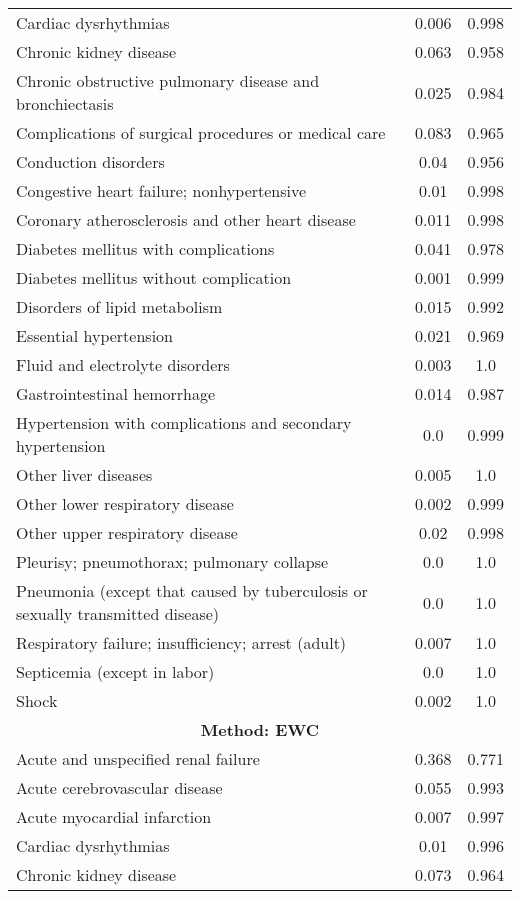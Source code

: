\documentclass{article}
\begin{document}
\begin{longtable}{lcc}
Cardiac dysrhythmias & 0.006 & 0.998 \\
Chronic kidney disease & 0.063 & 0.958 \\
Chronic obstructive pulmonary disease and bronchiectasis & 0.025 & 0.984 \\
Complications of surgical procedures or medical care & 0.083 & 0.965 \\
Conduction disorders & 0.04 & 0.956 \\
Congestive heart failure; nonhypertensive & 0.01 & 0.998 \\
Coronary atherosclerosis and other heart disease & 0.011 & 0.998 \\
Diabetes mellitus with complications & 0.041 & 0.978 \\
Diabetes mellitus without complication & 0.001 & 0.999 \\
Disorders of lipid metabolism & 0.015 & 0.992 \\
Essential hypertension & 0.021 & 0.969 \\
Fluid and electrolyte disorders & 0.003 & 1.0 \\
Gastrointestinal hemorrhage & 0.014 & 0.987 \\
Hypertension with complications and secondary hypertension & 0.0 & 0.999 \\
Other liver diseases & 0.005 & 1.0 \\
Other lower respiratory disease & 0.002 & 0.999 \\
Other upper respiratory disease & 0.02 & 0.998 \\
Pleurisy; pneumothorax; pulmonary collapse & 0.0 & 1.0 \\
Pneumonia (except that caused by tuberculosis or sexually transmitted disease) & 0.0 & 1.0 \\
Respiratory failure; insufficiency; arrest (adult) & 0.007 & 1.0 \\
Septicemia (except in labor) & 0.0 & 1.0 \\
Shock & 0.002 & 1.0 \\
\midrule
\multicolumn{3}{c}{\textbf{Method: EWC}} \\
\midrule
Acute and unspecified renal failure & 0.368 & 0.771 \\
Acute cerebrovascular disease & 0.055 & 0.993 \\
Acute myocardial infarction & 0.007 & 0.997 \\
Cardiac dysrhythmias & 0.01 & 0.996 \\
Chronic kidney disease & 0.073 & 0.964 \\

\end{longtable}
\end{document}
